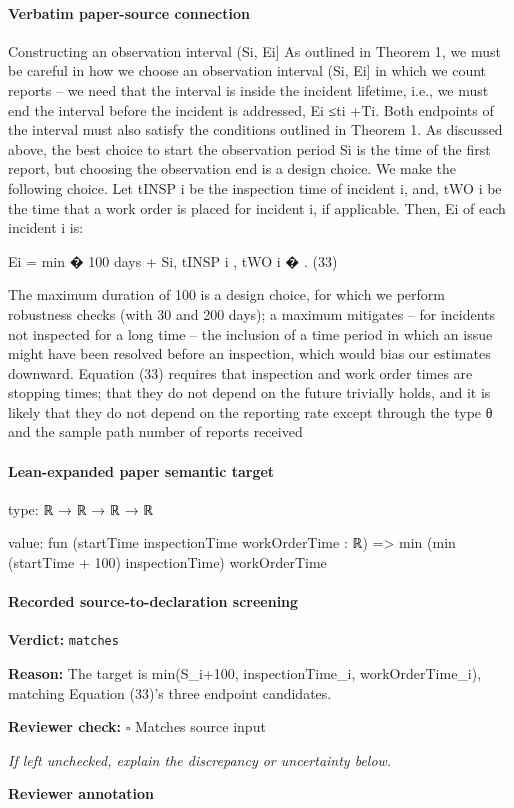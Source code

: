 \documentclass[10pt]{article}
\newcommand{\reviewerbox}{%
  \par\noindent\fbox{\parbox{0.96\linewidth}{\rule{0pt}{0.38in}}}\par
}
\newcommand{\reviewmatch}[1]{%
  \par\noindent\textbf{Reviewer check:} $\square$\; #1\par
  \noindent\emph{If left unchecked, explain the discrepancy or uncertainty below.}\par
}
\begin{document}
\paragraph{Verbatim paper-source connection}
\begin{ReviewVerbatim}
Constructing an observation interval (Si, Ei]
As outlined in Theorem 1, we must be careful
in how we choose an observation interval (Si, Ei] in which we count reports – we need that the
interval is inside the incident lifetime, i.e., we must end the interval before the incident is addressed,
Ei ≤ti +Ti. Both endpoints of the interval must also satisfy the conditions outlined in Theorem 1.
As discussed above, the best choice to start the observation period Si is the time of the first report,
but choosing the observation end is a design choice.
We make the following choice. Let tINSP
i
be the inspection time of incident i, and, tWO
i
be the
time that a work order is placed for incident i, if applicable. Then, Ei of each incident i is:

Ei = min
�
100 days + Si, tINSP
i
, tWO
i
�
.
(33)

The maximum duration of 100 is a design choice, for which we perform robustness checks (with 30
and 200 days); a maximum mitigates – for incidents not inspected for a long time – the inclusion
of a time period in which an issue might have been resolved before an inspection, which would bias
our estimates downward. Equation (33) requires that inspection and work order times are stopping
times; that they do not depend on the future trivially holds, and it is likely that they do not depend
on the reporting rate except through the type θ and the sample path number of reports received
\end{ReviewVerbatim}



\paragraph{Lean-expanded paper semantic target}
\begin{ReviewVerbatim}
type:
ℝ → ℝ → ℝ → ℝ

value:
fun (startTime inspectionTime workOrderTime : ℝ) => min (min (startTime + 100) inspectionTime) workOrderTime
\end{ReviewVerbatim}


\paragraph{Recorded source-to-declaration screening}
\textbf{Verdict:} \texttt{matches}
\\
{\raggedright
\textbf{Reason:} The target is min(S\_\allowbreak{}i+100, inspectionTime\_\allowbreak{}i, workOrderTime\_\allowbreak{}i), matching Equation (33)'s three endpoint candidates.\allowbreak{}
\par}
\reviewmatch{Matches source input}
\noindent\textbf{Reviewer annotation}\par
\reviewerbox
\clearpage
\hypertarget{paper-prerequisite-1061ea72385fd3fe}{}
\end{document}
